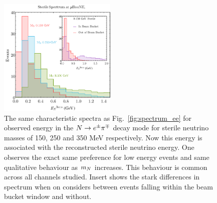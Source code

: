 \documentclass[11pt, a4paper]{article}
\newcommand{\reffig}[1]{Fig.~\ref{#1}}
\def\ster{\ensuremath N}
\begin{document}
\begin{figure}[t]
	\center
		\includegraphics[width=0.5\textwidth]{figures/sterilecomparason.pdf}
	\caption{\label{fig:spectrum_epi} 
		The same characteristic spectra as \reffig{fig:spectrum_ee} for observed energy in the  $\ster\rightarrow e^\pm \pi^\mp$ decay mode for sterile neutrino masses of 150,
	250 and 350 MeV respectively. Now this energy is associated with the reconstructed sterile neutrino energy. One observes the exact same preference for low energy events and same qualitative behaviour as $m_\ster$ increases. This behaviour is common across all channels studied. Insert shows the stark differences in spectrum when on considers between events falling within the beam bucket window and without. }
\end{figure}
\end{document}
